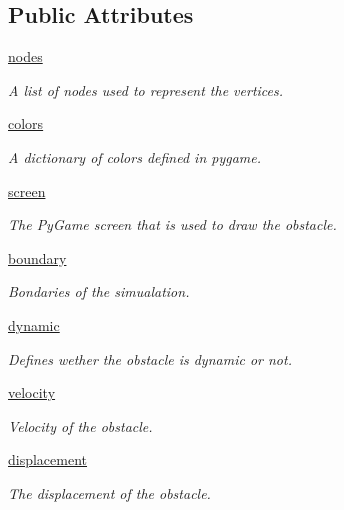 \subsection*{Public Attributes}
\begin{DoxyCompactItemize}
\item 
\hyperlink{classobstacle_1_1PolyObstacle_a125762f0b4a3c9ef8d75c81bc5bc608e}{nodes}
\begin{DoxyCompactList}\small\item\em A list of nodes used to represent the vertices. \end{DoxyCompactList}\item 
\hyperlink{classobstacle_1_1PolyObstacle_a73ce2986866adb38653645c5b84ec0ce}{colors}
\begin{DoxyCompactList}\small\item\em A dictionary of colors defined in pygame. \end{DoxyCompactList}\item 
\hyperlink{classobstacle_1_1PolyObstacle_ad65d210c167b0638ef317ef24670501c}{screen}
\begin{DoxyCompactList}\small\item\em The Py\-Game screen that is used to draw the obstacle. \end{DoxyCompactList}\item 
\hyperlink{classobstacle_1_1PolyObstacle_a999b6ef28126661fc8d54e1d86c094e0}{boundary}
\begin{DoxyCompactList}\small\item\em Bondaries of the simualation. \end{DoxyCompactList}\item 
\hyperlink{classobstacle_1_1PolyObstacle_a9667fa3bc98877420e2af4bb6d617576}{dynamic}
\begin{DoxyCompactList}\small\item\em Defines wether the obstacle is dynamic or not. \end{DoxyCompactList}\item 
\hyperlink{classobstacle_1_1PolyObstacle_adb043e45a95522cec92cd6ad35ca6595}{velocity}
\begin{DoxyCompactList}\small\item\em Velocity of the obstacle. \end{DoxyCompactList}\item 
\hyperlink{classobstacle_1_1PolyObstacle_af943155354bdf61ff754752819ff4013}{displacement}
\begin{DoxyCompactList}\small\item\em The displacement of the obstacle. \end{DoxyCompactList}\item 

\end{DoxyCompactItemize}
